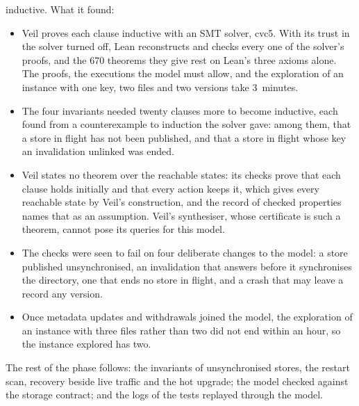 inductive. What it found:
\begin{itemize}
  \item Veil proves each clause inductive with an SMT solver, cvc5. With
    its trust in the solver turned off, Lean reconstructs and checks every
    one of the solver's proofs, and the 670 theorems they give rest on
    Lean's three axioms alone. The proofs, the executions the model must
    allow, and the exploration of an instance with one key, two files and
    two versions take 3~minutes.
  \item The four invariants needed twenty clauses more to become
    inductive, each found from a counterexample to induction the solver
    gave: among them, that a store in flight has not been published, and
    that a store in flight whose key an invalidation unlinked was ended.
  \item Veil states no theorem over the reachable states: its checks prove
    that each clause holds initially and that every action keeps it, which
    gives every reachable state by Veil's construction, and the record of
    checked properties names that as an assumption. Veil's synthesiser,
    whose certificate is such a theorem, cannot pose its queries for this
    model.
  \item The checks were seen to fail on four deliberate changes to the
    model: a store published unsynchronised, an invalidation that answers
    before it synchronises the directory, one that ends no store in
    flight, and a crash that may leave a record any version.
  \item Once metadata updates and withdrawals joined the model, the
    exploration of an instance with three files rather than two did not end
    within an hour, so the instance explored has two.
\end{itemize}
The rest of the phase follows: the invariants of unsynchronised stores,
the restart scan, recovery beside live traffic and the hot upgrade; the
model checked against the storage contract; and the logs of the tests
replayed through the model.

